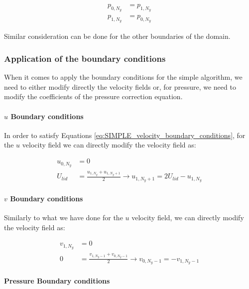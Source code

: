 \begin{align}
    p_{0, N_y} & = p_{1, N_y} \\
    p_{1, N_y} & = p_{0, N_y}
    \label{eq:SIMPLE_pressure_boundary_conditions}
\end{align}

Similar consideration can be done for the other boundaries of the domain.


\subsubsection{Application of the boundary conditions}

When it comes to apply the boundary conditions for the \acrshort{simple} algorithm, we need to either modify directly the velocity fields or, for pressure, we need to modify the coefficients of the pressure correction equation.

\paragraph{$u$ Boundary conditions}

In order to satisfy Equations \ref{eq:SIMPLE_velocity_boundary_conditions}, for the $u$ velocity field we can directly modify the velocity field as:

\begin{align}
    u_{0, N_y} & = 0                                                                                     \\
    U_{lid}    & = \frac{u_{1, N_y} + u_{1, N_y+1}}{2} \rightarrow u_{1, N_y+1} = 2 U_{lid} - u_{1, N_y}
\end{align}

\paragraph{$v$ Boundary conditions}

Similarly to what we have done for the $u$ velocity field, we can directly modify the velocity field as:

\begin{align}
    v_{1, N_y} & = 0                                                                               \\
    0          & = \frac{v_{1, N_y-1} + v_{0, N_y-1}}{2} \rightarrow v_{0, N_y-1} = - v_{1, N_y-1}
\end{align}

\paragraph{Pressure Boundary conditions}

